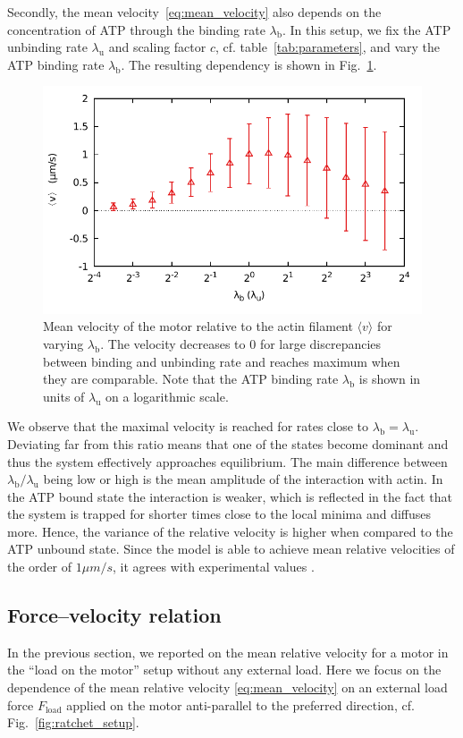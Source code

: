 \documentclass[aps,pre,twocolumn,showpacs,showkeys,superscriptaddress,floatfix]{revtex4-1}
\begin{document}
Secondly, the mean velocity~\eqref{eq:mean_velocity} also depends on the concentration of ATP through the binding rate $\lambda_\text{b}$. 
In this setup, we fix the ATP unbinding rate $\lambda_\text{u}$ and scaling factor $c$, cf. table~\ref{tab:parameters}, and vary the ATP binding rate $\lambda_\text{b}$. 
The resulting dependency is shown in Fig.~\ref{fig:v_k}. 
\begin{figure}[t]
\centering
\includegraphics[width=0.9\linewidth,height=!]{v_k}
\caption{
\label{fig:v_k} 
Mean velocity of the motor relative to the actin filament $\langle v \rangle$ for varying $\lambda_\text{b}$.
The velocity decreases to $0$ for large discrepancies between binding and unbinding rate and reaches maximum when they are comparable.
Note that the ATP binding rate $\lambda_\text{b}$ is shown in units of $\lambda_\text{u}$ on a logarithmic scale.
}
\end{figure}
We observe that the maximal velocity is reached for rates close to $\lambda_\text{b} = \lambda_\text{u}$. 
Deviating far from this ratio means that one of the states become dominant and thus the system effectively approaches equilibrium.  
The main difference between $\lambda_\text{b}/\lambda_\text{u}$ being low or high is the mean amplitude of the interaction with actin. 
In the ATP bound state the interaction is weaker, 
which is reflected in the fact that the system is trapped for shorter times close to the local minima and diffuses more. 
Hence, the variance of the relative velocity is higher when compared to the ATP unbound state. Since the model is able to achieve mean relative velocities of the order of $1\mu m/s$, it agrees with experimental values \cite{placcais2009spontaneous,saito1994movement}.


\subsection{Force--velocity relation}
\label{sec:force-velocity}
In the previous section, we reported on the mean relative velocity for a motor in the ``load on the motor'' setup without any external load. 
Here we focus on the dependence of the mean relative velocity \eqref{eq:mean_velocity} on an external load force $F_\text{load}$ applied on the motor anti-parallel to the preferred direction, 
cf. Fig.~\ref{fig:ratchet_setup}.
\end{document}
